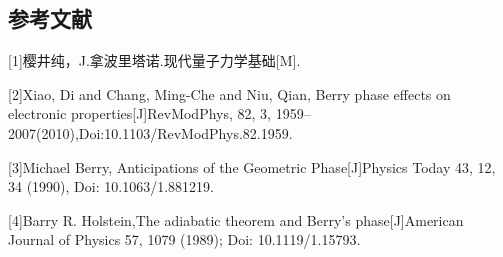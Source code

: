 \documentclass{article}
\begin{document}
\subsection{参考文献}
[1]樱井纯，J.拿波里塔诺.现代量子力学基础[M].


[2]Xiao, Di and Chang, Ming-Che and Niu, Qian, Berry phase effects on electronic properties[J]RevModPhys, 82, 3, 1959--2007(2010),Doi:10.1103/RevModPhys.82.1959.
	
	
[3]Michael Berry, Anticipations of the Geometric Phase[J]Physics Today 43, 12, 34 (1990), Doi: 10.1063/1.881219.


[4]Barry R. Holstein,The adiabatic theorem and Berry’s phase[J]American Journal of Physics 57, 1079 (1989); Doi: 10.1119/1.15793.
\end{document}
